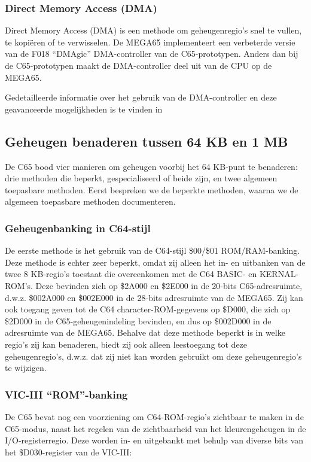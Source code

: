 \subsubsection{Direct Memory Access (DMA)}Direct Memory Access (DMA) is een methode om geheugenregio's snel te vullen, te kopiëren of te verwisselen. De MEGA65 implementeert een verbeterde versie van de F018 ``DMAgic'' DMA-controller van de C65-prototypen. Anders dan bij de C65-prototypen maakt de DMA-controller deel uit van de CPU op de MEGA65.

Gedetailleerde informatie over het gebruik van de DMA-controller en deze geavanceerde mogelijkheden is te vinden in 

\subsection{Geheugen benaderen tussen 64 KB en 1 MB}

De C65 bood vier manieren om geheugen voorbij het 64 KB-punt te benaderen: drie methoden die beperkt, gespecialiseerd of beide zijn, en twee algemeen toepasbare methoden. Eerst bespreken we de beperkte methoden, waarna we de algemeen toepasbare methoden documenteren.

\subsubsection{Geheugenbanking in C64-stijl}

De eerste methode is het gebruik van de C64-stijl \$00/\$01 ROM/RAM-banking. Deze methode is echter zeer beperkt, omdat zij alleen het in- en uitbanken van de twee 8 KB-regio's toestaat die overeenkomen met de C64 BASIC- en KERNAL-ROM's. Deze bevinden zich op \$2A000 en \$2E000 in de 20-bits C65-adresruimte, d.w.z. \$002A000 en \$002E000 in de 28-bits adresruimte van de MEGA65. Zij kan ook toegang geven tot de C64 character-ROM-gegevens op \$D000, die zich op \$2D000 in de C65-geheugenindeling bevinden, en dus op \$002D000 in de adresruimte van de MEGA65. Behalve dat deze methode beperkt is in welke regio's zij kan benaderen, biedt zij ook alleen leestoegang tot deze geheugenregio's, d.w.z. dat zij niet kan worden gebruikt om deze geheugenregio's te wijzigen.

\subsubsection{VIC-III ``ROM''-banking}

De C65 bevat nog een voorziening om C64-ROM-regio's zichtbaar te maken in de C65-modus, naast het regelen van de zichtbaarheid van het kleurengeheugen in de I/O-registerregio. Deze worden in- en uitgebankt met behulp van diverse bits van het \$D030-register van de VIC-III:

